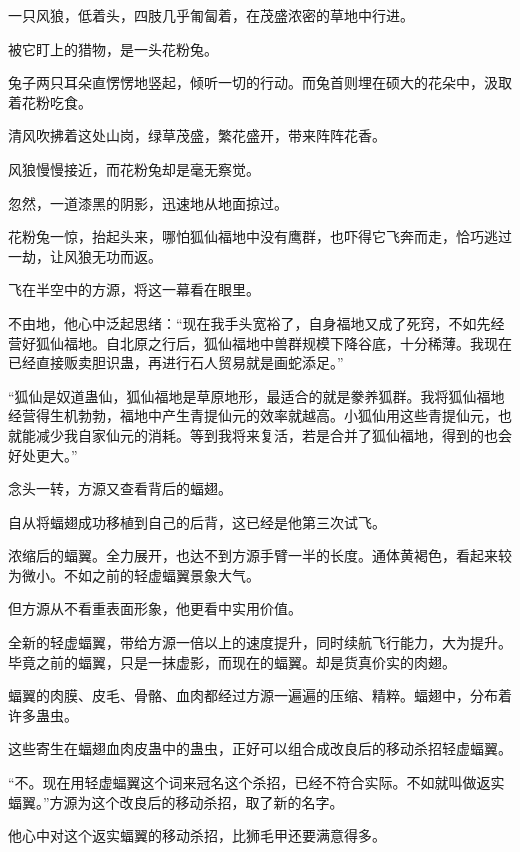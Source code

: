 
\begin{this_body}

一只风狼，低着头，四肢几乎匍匐着，在茂盛浓密的草地中行进。

被它盯上的猎物，是一头花粉兔。

兔子两只耳朵直愣愣地竖起，倾听一切的行动。而兔首则埋在硕大的花朵中，汲取着花粉吃食。

清风吹拂着这处山岗，绿草茂盛，繁花盛开，带来阵阵花香。

风狼慢慢接近，而花粉兔却是毫无察觉。

忽然，一道漆黑的阴影，迅速地从地面掠过。

花粉兔一惊，抬起头来，哪怕狐仙福地中没有鹰群，也吓得它飞奔而走，恰巧逃过一劫，让风狼无功而返。

飞在半空中的方源，将这一幕看在眼里。

不由地，他心中泛起思绪：“现在我手头宽裕了，自身福地又成了死窍，不如先经营好狐仙福地。自北原之行后，狐仙福地中兽群规模下降谷底，十分稀薄。我现在已经直接贩卖胆识蛊，再进行石人贸易就是画蛇添足。”

“狐仙是奴道蛊仙，狐仙福地是草原地形，最适合的就是豢养狐群。我将狐仙福地经营得生机勃勃，福地中产生青提仙元的效率就越高。小狐仙用这些青提仙元，也就能减少我自家仙元的消耗。等到我将来复活，若是合并了狐仙福地，得到的也会好处更大。”

念头一转，方源又查看背后的蝠翅。

自从将蝠翅成功移植到自己的后背，这已经是他第三次试飞。

浓缩后的蝠翼。全力展开，也达不到方源手臂一半的长度。通体黄褐色，看起来较为微小。不如之前的轻虚蝠翼景象大气。

但方源从不看重表面形象，他更看中实用价值。

全新的轻虚蝠翼，带给方源一倍以上的速度提升，同时续航飞行能力，大为提升。毕竟之前的蝠翼，只是一抹虚影，而现在的蝠翼。却是货真价实的肉翅。

蝠翼的肉膜、皮毛、骨骼、血肉都经过方源一遍遍的压缩、精粹。蝠翅中，分布着许多蛊虫。

这些寄生在蝠翅血肉皮蛊中的蛊虫，正好可以组合成改良后的移动杀招轻虚蝠翼。

“不。现在用轻虚蝠翼这个词来冠名这个杀招，已经不符合实际。不如就叫做返实蝠翼。”方源为这个改良后的移动杀招，取了新的名字。

他心中对这个返实蝠翼的移动杀招，比狮毛甲还要满意得多。


\end{this_body}
